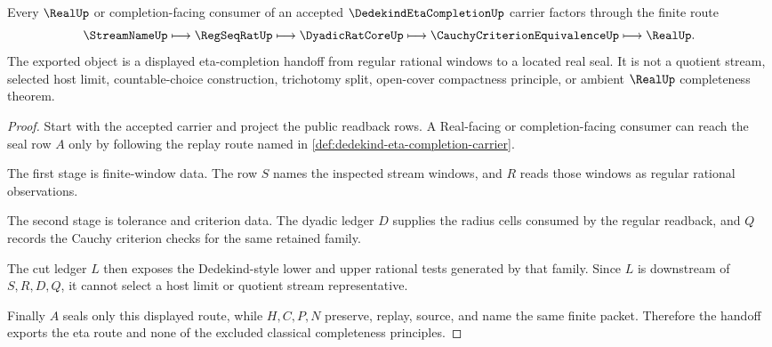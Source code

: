 \begin{theorem}
\label{thm:dedekind-eta-completion-l10-handoff}
Every $\RealUp$ or completion-facing consumer of an accepted $\DedekindEtaCompletionUp$ carrier factors through the finite route
$$
\StreamNameUp \longmapsto \RegSeqRatUp \longmapsto \DyadicRatCoreUp \longmapsto \CauchyCriterionEquivalenceUp \longmapsto \RealUp .
$$
The exported object is a displayed eta-completion handoff from regular rational windows to a located real seal. It is not a quotient stream, selected host limit, countable-choice construction, trichotomy split, open-cover compactness principle, or ambient $\RealUp$ completeness theorem.
\end{theorem}
\begin{proof}
Start with the accepted carrier and project the public readback rows. A Real-facing or completion-facing consumer can reach the seal row $A$ only by following the replay route named in \autoref{def:dedekind-eta-completion-carrier}.

The first stage is finite-window data. The row $S$ names the inspected stream windows, and $R$ reads those windows as regular rational observations.

The second stage is tolerance and criterion data. The dyadic ledger $D$ supplies the radius cells consumed by the regular readback, and $Q$ records the Cauchy criterion checks for the same retained family.

The cut ledger $L$ then exposes the Dedekind-style lower and upper rational tests generated by that family. Since $L$ is downstream of $S,R,D,Q$, it cannot select a host limit or quotient stream representative.

Finally $A$ seals only this displayed route, while $H,C,P,N$ preserve, replay, source, and name the same finite packet. Therefore the handoff exports the eta route and none of the excluded classical completeness principles.
\end{proof}


